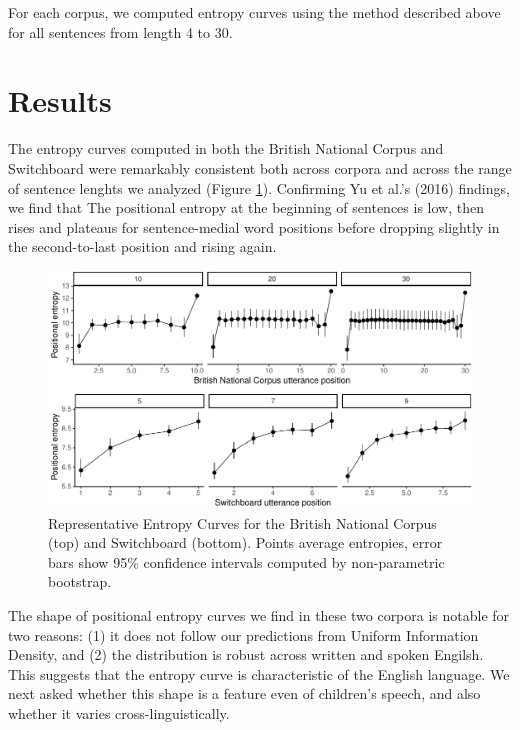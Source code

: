 \documentclass[10pt, letterpaper]{article}
\newenvironment{CodeChunk}{}{}
\begin{document}
For each corpus, we computed entropy curves using the method described
above for all sentences from length 4 to 30.

\hypertarget{results}{%
\section{Results}\label{results}}

The entropy curves computed in both the British National Corpus and
Switchboard were remarkably consistent both across corpora and across
the range of sentence lenghts we analyzed (Figure
\ref{fig:read_and_plot_exp1}). Confirming Yu et al.'s (2016) findings,
we find that The positional entropy at the beginning of sentences is
low, then rises and plateaus for sentence-medial word positions before
dropping slightly in the second-to-last position and rising again.

\begin{CodeChunk}
\begin{figure}[tb]

{\centering \includegraphics{figs/read_and_plot_exp1-1} 

}

\caption[Representative Entropy Curves for the British National Corpus (top) and Switchboard (bottom)]{Representative Entropy Curves for the British National Corpus (top) and Switchboard (bottom). Points average entropies, error bars show 95\% confidence intervals computed by non-parametric bootstrap.}\label{fig:read_and_plot_exp1}
\end{figure}
\end{CodeChunk}

The shape of positional entropy curves we find in these two corpora is
notable for two reasons: (1) it does not follow our predictions from
Uniform Information Density, and (2) the distribution is robust across
written and spoken Engilsh. This suggests that the entropy curve is
characteristic of the English language. We next asked whether this shape
is a feature even of children's speech, and also whether it varies
cross-linguistically.
\end{document}
